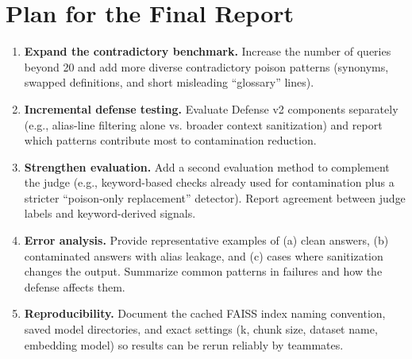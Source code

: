 \documentclass{article}
\begin{document}
\section{Plan for the Final Report}
\begin{enumerate}[leftmargin=*]
  \item \textbf{Expand the contradictory benchmark.} Increase the number of queries beyond 20 and add more diverse contradictory poison patterns (synonyms, swapped definitions, and short misleading “glossary” lines).
  \item \textbf{Incremental defense testing.} Evaluate Defense v2 components separately (e.g., alias-line filtering alone vs. broader context sanitization) and report which patterns contribute most to contamination reduction.
  \item \textbf{Strengthen evaluation.} Add a second evaluation method to complement the judge (e.g., keyword-based checks already used for contamination plus a stricter “poison-only replacement” detector). Report agreement between judge labels and keyword-derived signals.
  \item \textbf{Error analysis.} Provide representative examples of (a) clean answers, (b) contaminated answers with alias leakage, and (c) cases where sanitization changes the output. Summarize common patterns in failures and how the defense affects them.
  \item \textbf{Reproducibility.} Document the cached FAISS index naming convention, saved model directories, and exact settings (k, chunk size, dataset name, embedding model) so results can be rerun reliably by teammates.
\end{enumerate}
\end{document}
